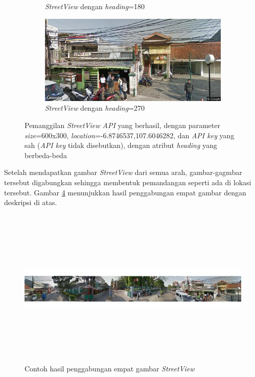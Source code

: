 \begin{figure}[]
\begin{subfigure}{.5\textwidth}
  		\caption{\textit{StreetView} dengan \textit{heading}=180}
  		\label{fig:streetview180}
	\end{subfigure}
	\begin{subfigure}{.5\textwidth}
  		\centering
  		\includegraphics[width=1\linewidth]{Gambar/streetview270.png}
  		\caption{\textit{StreetView} dengan \textit{heading}=270}
  		\label{fig:streetview270}
	\end{subfigure}
	\caption{Pemanggilan \textit{StreetView API} yang berhasil, dengan parameter \textit{size}=600x300, \textit{location}=-6.8746537,107.6046282, dan \textit{API key} yang sah (\textit{API key} tidak disebutkan), dengan atribut \textit{heading} yang berbeda-beda}
\label{fig:comp-streetview}
\end{figure}

Setelah mendapatkan gambar \textit{StreetView} dari semua arah, gambar-gagmbar tersebut digabungkan sehingga membentuk pemandangan seperti ada di lokasi tersebut. Gambar \ref{fig:streetview-vr} menunjukkan hasil penggabungan empat gambar dengan deskripsi di atas.

\begin{figure}[h]
	\centering
		\includegraphics[width=6.5in,height=3in]{Gambar/connected_streetview.png}
	\caption{Contoh hasil penggabungan empat gambar \textit{StreetView}}
	\label{fig:streetview-vr}
\end{figure}

